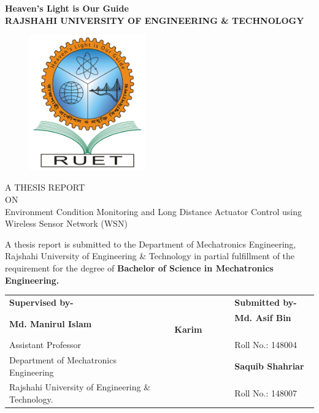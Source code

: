 \documentclass[12pt, oneside, a4paper]{extreport}
\begin{document}
\setcounter{page}{0}

\begin{center}
{\small{\bf Heaven's Light is Our Guide}}\\
{\small{\bf RAJSHAHI UNIVERSITY OF ENGINEERING \& TECHNOLOGY}}
\vspace{0.4in}
\begin{figure}[H]
  \centering
  \includegraphics[width=5cm]{ruet}
\end{figure}
\vspace{-0.1in}
{\large{ A THESIS REPORT\\ ON}}\\
\vspace{0.2in}
 {\LARGE{Environment Condition Monitoring and Long Distance Actuator Control using Wireless Sensor Network (WSN)\\}}

\vspace{0.5in}
\end{center}
A thesis report is submitted to the Department of Mechatronics Engineering, Rajshahi
University of Engineering \& Technology in partial fulfillment of the requirement for the degree
of {\bf Bachelor of Science in Mechatronics Engineering.} \\

\hspace{-.35in}
\begin{tabular}{p{}cp{}}
{\bf Supervised by-} && ~~~~~~~~~~~~~~{\bf Submitted by-}\\
{\bf Md. Manirul Islam} && ~~~~~~~~~~~~~~{\bf Md. Asif Bin Karim }\\
Assistant Professor && ~~~~~~~~~~~~~~Roll No.: 148004\\
Department of Mechatronics Engineering && ~~~~~~~~~~~~~~{\bf Saquib Shahriar } \\
Rajshahi University of Engineering \& Technology. && ~~~~~~~~~~~~~~Roll No.: 148007
\end{tabular}
\clearpage
\end{document}
